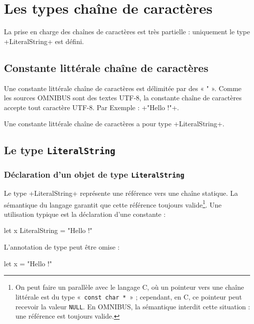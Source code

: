 




\chapter{Les types chaîne de caractères}

La prise en charge des chaînes de caractères est très partielle : uniquement le type \omnibus+LiteralString+ est défini.

\section{Constante littérale chaîne de caractères}

Une constante littérale chaîne de caractères est délimitée par des « " ». Comme les sources OMNIBUS sont des textes UTF-8, la constante chaîne de caractères accepte tout caractère UTF-8. Par Exemple : \omnibus+"Hello !"+. %

Une constante littérale chaîne de caractères a pour type \omnibus+LiteralString+.


\section{Le type \texttt{LiteralString}}

\subsection{Déclaration d'un objet de type \texttt{LiteralString}}

Le type \omnibus+LiteralString+ représente une référence vers une chaîne statique. La sémantique du langage garantit que cette référence toujours valide\footnote{On peut faire un parallèle avec le langage C, où un pointeur vers une chaîne littérale est du type «~\texttt{const char *}~» ; cependant, en C, ce pointeur peut recevoir la valeur \texttt{NULL}. En OMNIBUS, la sémantique interdit cette situation : une référence est toujours valide.}. Une utilisation typique est la déclaration d'une constante :
\begin{OMNIBUS}
let x LiteralString = "Hello !"
\end{OMNIBUS}

L'annotation de type peut être omise :
\begin{OMNIBUS}
let x = "Hello !"
\end{OMNIBUS}

